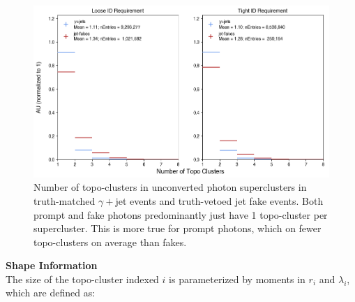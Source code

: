 \begin{figure}[htb]
    \centering
    \includegraphics[width=\textwidth]{chapters/chapter4_photonID/images/hists/y_nTopoClusters.png}
    \caption[Number of topo-clusters in unconverted photon superclusters]
    {Number of topo-clusters in unconverted photon superclusters in truth-matched $\gamma+$jet events and truth-vetoed jet fake events. Both prompt and fake photons predominantly just have 1 topo-cluster per supercluster. This is more true for prompt photons, which on fewer topo-clusters on average than fakes.} 
    \label{fig:num-clusters}
\end{figure}


\noindent\textbf{Shape Information}\\
\indent The size of the topo-cluster indexed $i$ is parameterized by moments in $r_i$ and $\lambda_i$, which are defined as:

